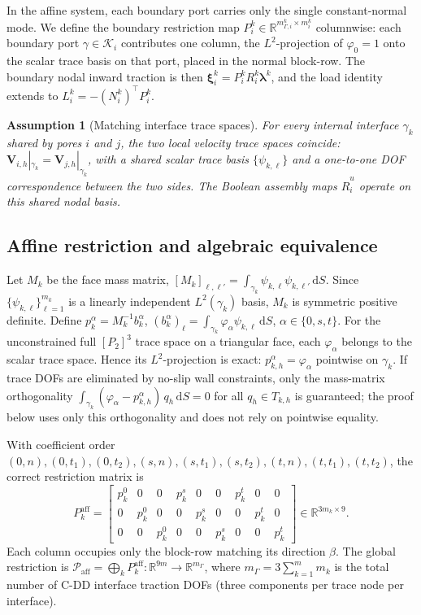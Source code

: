 \documentclass[11pt,a4paper]{article}
\newtheorem{assumption}{Assumption}[section]
\newcommand{\R}{\mathbb{R}}
\newcommand{\iface}{\gamma}
\newcommand{\trac}{\bm{\lambda}}
\begin{document}
In the affine system, each boundary port carries only the single
constant-normal mode.  We define the boundary restriction map
$P_i^k \in \R^{m_{\Gamma,i}^k \times m_i^k}$ columnwise: each
boundary port $\gamma \in \mathcal{K}_i$ contributes one column, the
$L^2$-projection of $\varphi_0 = 1$ onto the scalar trace basis on
that port, placed in the normal block-row.  The boundary nodal inward
traction is then $\bm{\xi}_i^k = P_i^k R_i^k \trac^k$, and the
load identity extends to $L_i^k = -(N_i^k)^\top P_i^k$.

\begin{assumption}[Matching interface trace spaces]\label{ass:matching-trace}
  For every internal interface $\iface_k$ shared by pores $i$ and $j$,
  the two local velocity trace spaces coincide:
  $\mathbf{V}_{i,h}|_{\iface_k} = \mathbf{V}_{j,h}|_{\iface_k}$,
  with a shared scalar trace basis $\{\psi_{k,\ell}\}$ and a one-to-one
  DOF correspondence between the two sides.  The Boolean assembly maps
  $\widehat{R}_i^u$ operate on this shared nodal basis.
\end{assumption}

\subsection{Affine restriction and algebraic equivalence}

Let $M_k$ be the face mass matrix,
$[M_k]_{\ell,\ell'} = \int_{\iface_k} \psi_{k,\ell}\psi_{k,\ell'}\,\mathrm{d}S$.
Since $\{\psi_{k,\ell}\}_{\ell=1}^{m_k}$ is a linearly independent
$L^2(\iface_k)$ basis, $M_k$ is symmetric positive definite.
Define $p_k^\alpha = M_k^{-1} b_k^\alpha$,
$(b_k^\alpha)_\ell = \int_{\iface_k} \varphi_\alpha \psi_{k,\ell}\,\mathrm{d}S$,
$\alpha \in \{0,s,t\}$.
For the unconstrained full $[P_2]^3$ trace space on a triangular face,
each $\varphi_\alpha$ belongs to the scalar trace space.  Hence its
$L^2$-projection is exact: $p_{k,h}^\alpha = \varphi_\alpha$ pointwise
on $\iface_k$.  If trace DOFs are eliminated by no-slip wall constraints,
only the mass-matrix orthogonality
$\int_{\iface_k}(\varphi_\alpha-p_{k,h}^\alpha)\,q_h\,\mathrm{d}S=0$
for all $q_h\in T_{k,h}$ is guaranteed; the proof below uses only this
orthogonality and does not rely on pointwise equality.

With coefficient order
$(0,n),(0,t_1),(0,t_2),(s,n),(s,t_1),(s,t_2),(t,n),(t,t_1),(t,t_2)$,
the correct restriction matrix is
\begin{equation}\label{eq:Paff}
  P_k^{\text{aff}} =
  \begin{bmatrix}
    p_k^0&0&0&p_k^s&0&0&p_k^t&0&0\\
    0&p_k^0&0&0&p_k^s&0&0&p_k^t&0\\
    0&0&p_k^0&0&0&p_k^s&0&0&p_k^t
  \end{bmatrix}
  \in \R^{3m_k \times 9}.
\end{equation}
Each column occupies only the block-row matching its direction $\beta$.
The global restriction is
$\mathcal{P}_{\text{aff}} = \bigoplus_k P_k^{\text{aff}}
 : \R^{9m} \to \R^{m_\Gamma}$,
where $m_\Gamma = 3\sum_{k=1}^m m_k$ is the total number of C-DD
interface traction DOFs (three components per trace node per interface).
\end{document}

